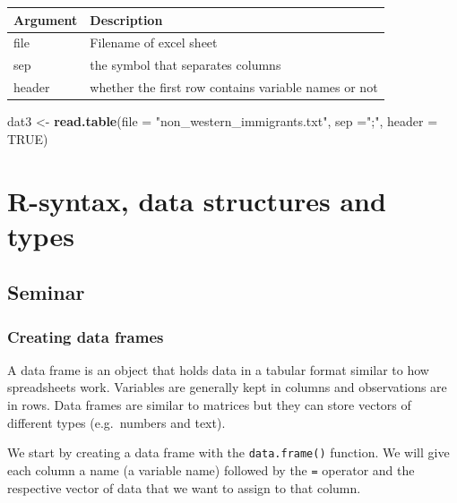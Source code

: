 \documentclass[]{article}
\newenvironment{Shaded}{\begin{snugshade}}{\end{snugshade}}
\newcommand{\DataTypeTok}[1]{\textcolor[rgb]{0.13,0.29,0.53}{#1}}
\newcommand{\KeywordTok}[1]{\textcolor[rgb]{0.13,0.29,0.53}{\textbf{#1}}}
\newcommand{\NormalTok}[1]{#1}
\newcommand{\OtherTok}[1]{\textcolor[rgb]{0.56,0.35,0.01}{#1}}
\newcommand{\StringTok}[1]{\textcolor[rgb]{0.31,0.60,0.02}{#1}}
\begin{document}
\begin{longtable}[]{@{}ll@{}}
\toprule
Argument & Description\tabularnewline
\midrule
\endhead
file & Filename of excel sheet\tabularnewline
sep & the symbol that separates columns\tabularnewline
header & whether the first row contains variable names or not\tabularnewline
\bottomrule
\end{longtable}

\begin{Shaded}
\begin{Highlighting}[]
\NormalTok{dat3 <-}\StringTok{ }\KeywordTok{read.table}\NormalTok{(}\DataTypeTok{file =} \StringTok{"non_western_immigrants.txt"}\NormalTok{, }\DataTypeTok{sep =}\StringTok{";"}\NormalTok{, }\DataTypeTok{header =} \OtherTok{TRUE}\NormalTok{)}
\end{Highlighting}
\end{Shaded}

\hypertarget{r-syntax-data-structures-and-types-1}{%
\section{R-syntax, data structures and types}\label{r-syntax-data-structures-and-types-1}}

\hypertarget{seminar-2}{%
\subsection{Seminar}\label{seminar-2}}

\hypertarget{creating-data-frames}{%
\subsubsection{Creating data frames}\label{creating-data-frames}}

A data frame is an object that holds data in a tabular format similar to how spreadsheets work. Variables are generally kept in columns and observations are in rows. Data frames are similar to matrices but they can store vectors of different types (e.g.~numbers and text).

We start by creating a data frame with the \texttt{data.frame()} function. We will give each column a name (a variable name) followed by the \texttt{=} operator and the respective vector of data that we want to assign to that column.
\end{document}

